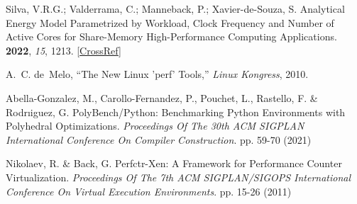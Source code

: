 \begin{thebibliography}{999}
	\newblock Silva, V.R.G.; Valderrama, C.; Manneback, P.; Xavier-de-Souza, S.
	\newblock Analytical Energy Model Parametrized by Workload, Clock Frequency and Number of Active Cores for Share-Memory High-Performance Computing Applications.
	 {\bf 2022}, {\em  15},  1213. [\href{http://dx.doi.org/10.3390/en15031213}{CrossRef}]


	A.~C. de~Melo, ``{The New Linux 'perf' Tools},'' {\em Linux Kongress}, 2010.
	
	Abella-Gonzalez, M., Carollo-Fernandez, P., Pouchet, L., Rastello, F. \& Rodrıiguez, G. PolyBench/Python: Benchmarking Python Environments with Polyhedral Optimizations. {\em Proceedings Of The 30th ACM SIGPLAN International Conference On Compiler Construction}. pp. 59-70 (2021)

	Nikolaev, R. \& Back, G. Perfctr-Xen: A Framework for Performance Counter Virtualization. {\em Proceedings Of The 7th ACM SIGPLAN/SIGOPS International Conference On Virtual Execution Environments}. pp. 15-26 (2011)


\end{thebibliography}